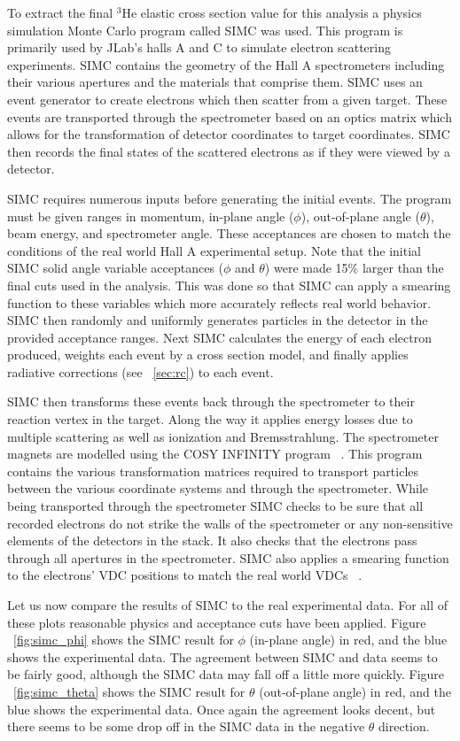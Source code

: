 To extract the final $^3$He elastic cross section value for this analysis a physics simulation Monte Carlo program called SIMC was used. This program is primarily used by JLab's halls A and C to simulate electron scattering experiments. SIMC contains the geometry of the Hall A spectrometers including their various apertures and the materials that comprise them. SIMC uses an event generator to create electrons which then scatter from a given target. These events are transported through the spectrometer based on an optics matrix which allows for the transformation of detector coordinates to target coordinates. SIMC then records the final states of the scattered electrons as if they were viewed by a detector.

SIMC requires numerous inputs before generating the initial events. The program must be given ranges in momentum, in-plane angle ($\phi$), out-of-plane angle ($\theta$), beam energy, and spectrometer angle. These acceptances are chosen to match the conditions of the real world Hall A experimental setup. Note that the initial SIMC solid angle variable acceptances ($\phi$ and $\theta$) were made 15$\%$ larger than the final cuts used in the analysis. This was done so that SIMC can apply a smearing function to these variables which more accurately reflects real world behavior. SIMC then randomly and uniformly generates particles in the detector in the provided acceptance ranges. Next SIMC calculates the energy of each electron produced, weights each event by a cross section model, and finally applies radiative corrections (see ~\ref{sec:rc}) to each event. 

SIMC then transforms these events back through the spectrometer to their reaction vertex in the target. Along the way it applies energy losses due to multiple scattering as well as ionization and Bremsstrahlung. The spectrometer magnets are modelled using the COSY INFINITY program ~\cite{cosy}. This program contains the various transformation matrices required to transport particles between the various coordinate systems and through the spectrometer. While being transported through the spectrometer SIMC checks to be sure that all recorded electrons do not strike the walls of the spectrometer or any non-sensitive elements of the detectors in the stack. It also checks that the electrons pass through all apertures in the spectrometer. SIMC also applies a smearing function to the electrons' VDC positions to match the real world VDCs ~\cite{Thesis:Wang}. 

Let us now compare the results of SIMC to the real experimental data. For all of these plots reasonable physics and acceptance cuts have been applied. Figure ~\ref{fig:simc_phi} shows the SIMC result for $\phi$ (in-plane angle) in red, and the blue shows the experimental data. The agreement between SIMC and data seems to be fairly good, although the SIMC data may fall off a little more quickly. Figure ~\ref{fig:simc_theta} shows the SIMC result for $\theta$ (out-of-plane angle) in red, and the blue shows the experimental data. Once again the agreement looks decent, but there seems to be some drop off in the SIMC data in the negative $\theta$ direction.  


